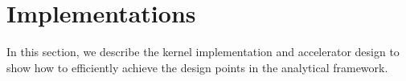 \section{Implementations}
\label{sec:implementation}
In this section, we describe the kernel implementation and accelerator design to show how to efficiently achieve the design points in the analytical framework.



